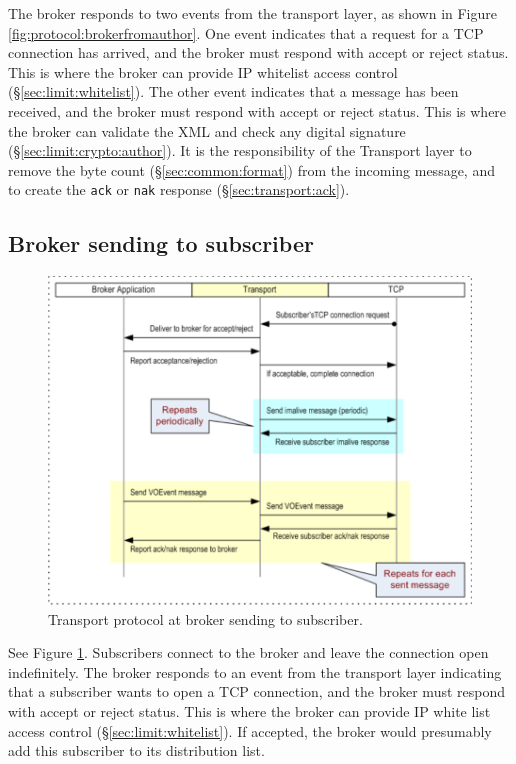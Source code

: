 \documentclass[a4paper,11pt]{ivoa}
\begin{document}
The broker responds to two events from the transport layer, as shown in Figure
\ref{fig:protocol:brokerfromauthor}. One event indicates that a request for a
TCP connection has arrived, and the broker must respond with accept or reject
status. This is where the broker can provide IP whitelist access control
(\S\ref{sec:limit:whitelist}). The other event indicates that a message has
been received, and the broker must respond with accept or reject status. This
is where the broker can validate the XML and check any digital signature
(\S\ref{sec:limit:crypto:author}). It is the responsibility of the Transport
layer to remove the byte count (\S\ref{sec:common:format}) from the incoming
message, and to create the \texttt{ack} or \texttt{nak} response
(\S\ref{sec:transport:ack}).

\subsection{Broker sending to subscriber}

\begin{figure}
  \begin{center}
  \includegraphics{figures/brokertosub.pdf}
  \end{center}

  \caption{Transport protocol at broker sending to subscriber.}

  \label{fig:protocol:brokertosub}
\end{figure}

See Figure \ref{fig:protocol:brokertosub}. Subscribers connect to the broker
and leave the connection open indefinitely. The broker responds to an event
from the transport layer indicating that a subscriber wants to open a TCP
connection, and the broker must respond with accept or reject status. This is
where the broker can provide IP white list access control
(\S\ref{sec:limit:whitelist}). If accepted, the broker would presumably add
this subscriber to its distribution list.
\end{document}
